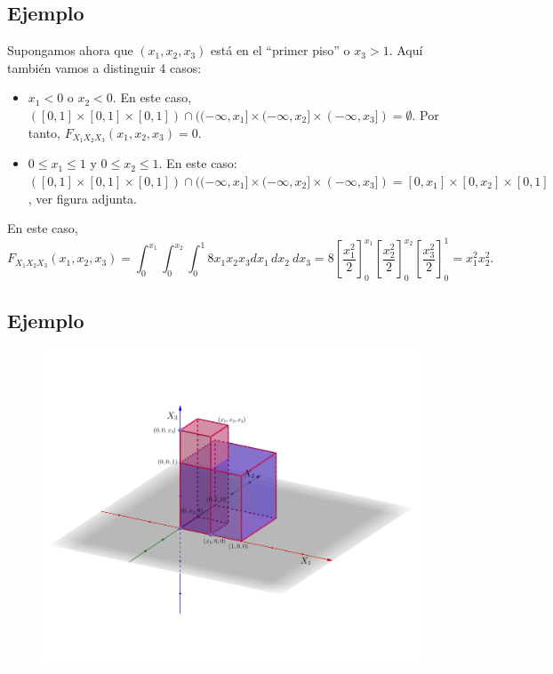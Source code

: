 \documentclass[]{book}
\begin{document}
\hypertarget{ejemplo-107}{%
\subsection{Ejemplo}\label{ejemplo-107}}

Supongamos ahora que \((x_1,x_2,x_3)\) está en el ``primer piso'' o \(x_3>1\). Aquí también vamos a distinguir 4 casos:

\begin{itemize}
\item
  \(x_1 <0\) o \(x_2 <0\). En este caso, \(([0,1]\times [0,1]\times [0,1])\cap ((-\infty,x_1]\times (-\infty,x_2]\times (-\infty,x_3])=\emptyset\). Por tanto, \(F_{X_1X_2X_3}(x_1,x_2,x_3)=0\).
\item
  \(0\leq x_1\leq 1\) y \(0\leq x_2\leq 1\). En este caso: \(([0,1]\times [0,1]\times [0,1])\cap ((-\infty,x_1]\times (-\infty,x_2]\times (-\infty,x_3])=[0,x_1]\times [0,x_2]\times [0,1]\), ver figura adjunta.
\end{itemize}

En este caso,
\[
F_{X_1X_2X_3}(x_1,x_2,x_3)=\int_{0}^{x_1}\int_{0}^{x_2}\int_{0}^{1} 8 x_1 x_2 x_3 dx_1\, dx_2\ dx_3 = 
8\left[\frac{x_1^2}{2}\right]_0^{x_1}\left[\frac{x_2^2}{2}\right]_0^{x_2}\left[\frac{x_3^2}{2}\right]_0^{1} = x_1^2 x_2^2.
\]

\hypertarget{ejemplo-108}{%
\subsection{Ejemplo}\label{ejemplo-108}}

\begin{figure}
\includegraphics[width=800px]{Images/Fx1x2x3piso} \end{figure}
\end{document}
